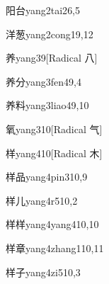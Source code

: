 \begin{verbete}{阳台}{yang2tai2}{6,5}
\end{verbete}

\begin{verbete}{洋葱}{yang2cong1}{9,12}
\end{verbete}

\begin{verbete}{养}{yang3}{9}[Radical 八]
\end{verbete}

\begin{verbete}{养分}{yang3fen4}{9,4}
\end{verbete}

\begin{verbete}{养料}{yang3liao4}{9,10}
\end{verbete}

\begin{verbete}{氧}{yang3}{10}[Radical 气]
\end{verbete}

\begin{verbete}{样}{yang4}{10}[Radical 木]
\end{verbete}

\begin{verbete}{样品}{yang4pin3}{10,9}
\end{verbete}

\begin{verbete}{样儿}{yang4r5}{10,2}
\end{verbete}

\begin{verbete}{样样}{yang4yang4}{10,10}
\end{verbete}

\begin{verbete}{样章}{yang4zhang1}{10,11}
\end{verbete}

\begin{verbete}{样子}{yang4zi5}{10,3}
\end{verbete}


